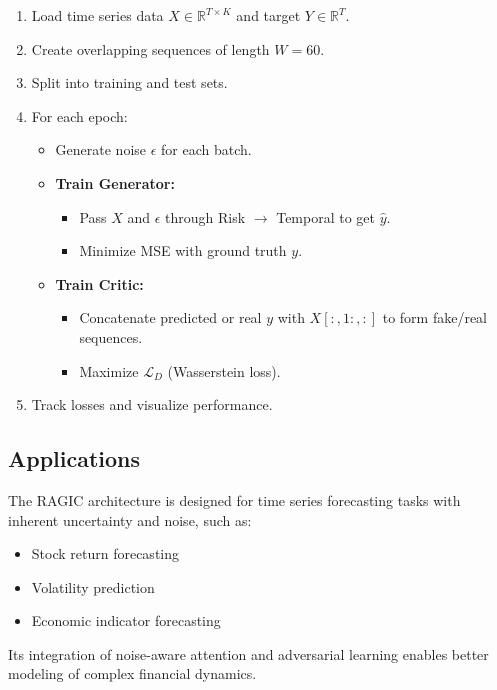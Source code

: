 \begin{enumerate}
    \item Load time series data $X \in \mathbb{R}^{T \times K}$ and target $Y \in \mathbb{R}^T$.
    \item Create overlapping sequences of length $W=60$.
    \item Split into training and test sets.
    \item For each epoch:
    \begin{itemize}
        \item Generate noise $\epsilon$ for each batch.
        \item \textbf{Train Generator:}
            \begin{itemize}
                \item Pass $X$ and $\epsilon$ through Risk $\rightarrow$ Temporal to get $\hat{y}$.
                \item Minimize MSE with ground truth $y$.
            \end{itemize}
        \item \textbf{Train Critic:}
            \begin{itemize}
                \item Concatenate predicted or real $y$ with $X[:, 1:, :]$ to form fake/real sequences.
                \item Maximize $\mathcal{L}_D$ (Wasserstein loss).
            \end{itemize}
    \end{itemize}
    \item Track losses and visualize performance.
\end{enumerate}

\subsection{Applications}

The RAGIC architecture is designed for time series forecasting tasks with inherent uncertainty and noise, such as:
\begin{itemize}
    \item Stock return forecasting
    \item Volatility prediction
    \item Economic indicator forecasting
\end{itemize}

Its integration of noise-aware attention and adversarial learning enables better modeling of complex financial dynamics.
